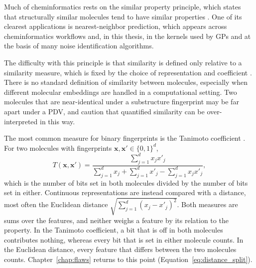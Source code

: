 Much of cheminformatics rests on the similar property principle, which states that structurally similar molecules tend to have similar properties \citep{Johnson1990, vanTilborg2022}.
One of its clearest applications is nearest-neighbor prediction, which appears across cheminformatics workflows and, in this thesis, in the kernels used by GPs and at the basis of many noise identification algorithms.

The difficulty with this principle is that similarity is defined only relative to a similarity measure, which is fixed by the choice of representation and
coefficient \citep{Maggiora2014}. There is no standard definition of similarity between molecules, especially when different molecular embeddings are handled in a computational setting. Two molecules that are near-identical under a substructure fingerprint may be far apart under a PDV, and \citet{Maggiora2014} caution that quantified similarity can be over-interpreted in this way.

The most common measure for binary fingerprints is the Tanimoto coefficient \citep{Bajusz2015}. For two molecules with fingerprints $\mathbf{x}, \mathbf{x}' \in \{0,1\}^d$,
\begin{equation}
T(\mathbf{x}, \mathbf{x}') = \frac{\sum_{j=1}^{d} x_j x'_j}{\sum_{j=1}^{d} x_j + \sum_{j=1}^{d} x'_j - \sum_{j=1}^{d} x_j x'_j},
\label{eq:tanimoto}
\end{equation}
which is the number of bits set in both molecules divided by the number of bits set in either. Continuous representations are instead compared with a distance, most often the Euclidean distance $\sqrt{\sum_{j=1}^{d}(x_j - x'_j)^2}$. Both measures are sums over the features, and neither weighs a feature by its relation to the property. In the Tanimoto coefficient, a bit that is off in both molecules contributes nothing, whereas every bit that is set in either molecule counts. In the Euclidean distance, every feature that differs between the two molecules counts. Chapter~\ref{chap:flaws} returns to this point (Equation~\ref{eq:distance_split}).

